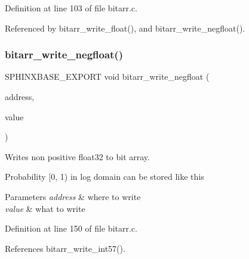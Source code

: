 Definition at line 103 of file bitarr.\+c.



Referenced by bitarr\+\_\+write\+\_\+float(), and bitarr\+\_\+write\+\_\+negfloat().

\mbox{\label{bitarr_8h_a7b4b2007c2f0caf23b2fe2fd5a11e004}} 
\subsubsection{bitarr\+\_\+write\+\_\+negfloat()}
{\footnotesize\ttfamily S\+P\+H\+I\+N\+X\+B\+A\+S\+E\+\_\+\+E\+X\+P\+O\+RT void bitarr\+\_\+write\+\_\+negfloat (\begin{DoxyParamCaption}\item[{\textbf{ bitarr\+\_\+address\+\_\+t}}]{address,  }\item[{float}]{value }\end{DoxyParamCaption})}



Writes non positive float32 to bit array. 

Probability [0, 1) in log domain can be stored like this 
\begin{DoxyParams}{Parameters}
{\em address} & where to write \\
\hline
{\em value} & what to write \\
\hline
\end{DoxyParams}


Definition at line 150 of file bitarr.\+c.



References bitarr\+\_\+write\+\_\+int57().

